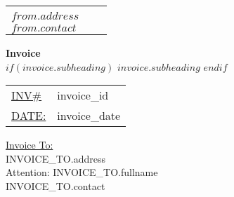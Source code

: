 \documentclass{letter}
\begin{document}
\thispagestyle{empty}

\begin{tabularx}{\textwidth}{l X l}
    \hspace{-8pt} \multirow{5}{*} & \textbf{} & \hskip12pt\multirow{5}{*}{\begin{tabular}{r}\textbf{ $from.fullname$ } \\  $from.address$  \\ $from.contact$ \end{tabular}}\hspace{-6pt} \\
\end{tabularx}

\vspace{2 cm}

\begin{center}
    \Large\textbf{Invoice}\\
$if(invoice.subheading)$
    \normalsize\textbf{$invoice.subheading$}
$endif$
\end{center}

\normalsize

\begin{tabularx}{\textwidth}{X l}
    \hspace*{\fill} \underline{INV\#}    & {{ invoice_id }}   \\
    \hspace*{\fill} \underline{DATE: } & {{ invoice_date }} \\
\end{tabularx}

\vspace{-1 cm}

\underline{Invoice To:}\\{{ INVOICE_TO.address }}\\Attention: {{ INVOICE_TO.fullname }}\\{{ INVOICE_TO.contact }}

\vspace{2 cm}
\end{document}
